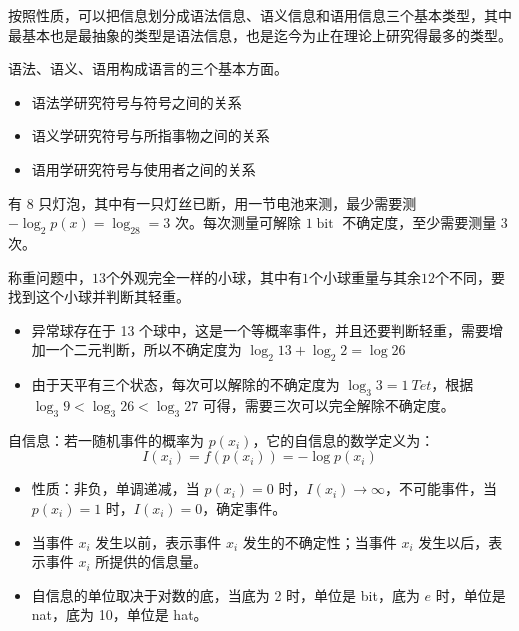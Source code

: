 \begin{remark}
    按照性质，可以把信息划分成语法信息、语义信息和语用信息三个基本类型，其中最基本也是最抽象的类型是语法信息，也是迄今为止在理论上研究得最多的类型。

    语法、语义、语用构成语言的三个基本方面。
    \begin{itemize}
        \item 语法学研究符号与符号之间的关系
        \item 语义学研究符号与所指事物之间的关系
        \item 语用学研究符号与使用者之间的关系
    \end{itemize}
\end{remark}

\begin{remark}
    有 8 只灯泡，其中有一只灯丝已断，用一节电池来测，最少需要测 $-\log_2p(x) = \log_28 = 3$ 次。每次测量可解除 $1\operatorname{bit}$ 不确定度，至少需要测量 3 次。
\end{remark}

\begin{remark}
    称重问题中，$13$个外观完全一样的小球，其中有$1$个小球重量与其余$12$个不同，要找到这个小球并判断其轻重。

    \begin{itemize}
        \item 异常球存在于 13 个球中，这是一个等概率事件，并且还要判断轻重，需要增加一个二元判断，所以不确定度为 $\log_2 13 + \log_2 2 = \log 26$
        \item 由于天平有三个状态，每次可以解除的不确定度为 $\log_3 3 = \SI{1}{Tet}$，根据 $\log _{3} 9<\log _{3} 26<\log _{3} 27$ 可得，需要三次可以完全解除不确定度。
    \end{itemize}
\end{remark}

\begin{remark}
    自信息：若一随机事件的概率为 $p(x_i)$，它的自信息的数学定义为：\[I(x_i) = f(p(x_i)) = -\log p(x_i)\]
    \begin{itemize}
        \item 性质：非负，单调递减，当 $p(x_i) = 0$ 时，$I(x_i) \to \infty$，不可能事件，当 $p(x_i) = 1$ 时，$I(x_i) = 0$，确定事件。
        \item 当事件 $x_i$ 发生以前，表示事件 $x_i$ 发生的不确定性；当事件 $x_i$ 发生以后，表示事件 $x_i$ 所提供的信息量。
        \item 自信息的单位取决于对数的底，当底为 2 时，单位是 bit，底为 $e$ 时，单位是 nat，底为 10，单位是 hat。
    \end{itemize}
\end{remark}

